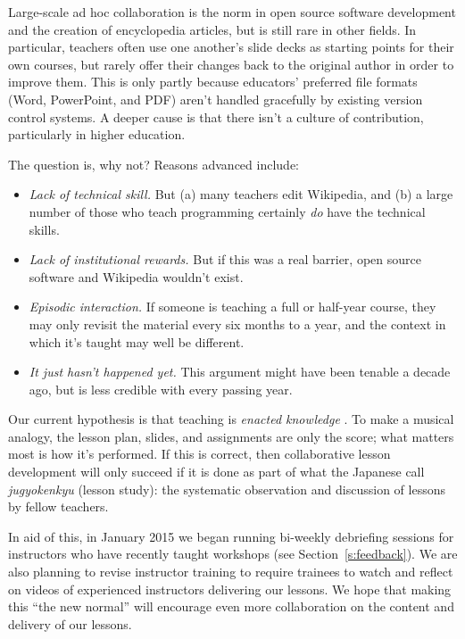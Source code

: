 \documentclass[10pt,a4paper,twocolumn]{article}
\begin{document}
Large-scale ad hoc collaboration is the norm in open source software
development and the creation of encyclopedia articles, but is still
rare in other fields. In particular, teachers often use one another's
slide decks as starting points for their own courses, but rarely offer
their changes back to the original author in order to improve
them. This is only partly because educators' preferred file formats
(Word, PowerPoint, and PDF) aren't handled gracefully by existing
version control systems.  A deeper cause is that there isn't a culture
of contribution, particularly in higher education.

The question is, why not?  Reasons advanced include:

\begin{itemize}

\item \emph{Lack of technical skill.} But (a) many teachers edit
  Wikipedia, and (b) a large number of those who teach programming
  certainly \emph{do} have the technical skills.

\item \emph{Lack of institutional rewards.} But if this was a real
  barrier, open source software and Wikipedia wouldn't exist.

\item \emph{Episodic interaction.} If someone is teaching a full or
  half-year course, they may only revisit the material every six
  months to a year, and the context in which it's taught may well be
  different.

\item \emph{It just hasn't happened yet.} This argument might have
  been tenable a decade ago, but is less credible with every passing
  year.

\end{itemize}

Our current hypothesis is that teaching is \emph{enacted knowledge}
\cite{fincher2007,fincher2012}.
To make a musical analogy, the lesson plan, slides, and assignments
are only the score; what matters most is how it's performed.  If this
is correct, then collaborative lesson development will only succeed if
it is done as part of what the Japanese call \emph{jugyokenkyu}
(lesson study): the systematic observation and discussion of lessons
by fellow teachers.

In aid of this, in January 2015 we began running bi-weekly debriefing
sessions for instructors who have recently taught workshops (see
Section~\ref{s:feedback}).  We are also planning to revise instructor
training to require trainees to watch and reflect on videos of
experienced instructors delivering our lessons.  We hope that making
this ``the new normal'' will encourage even more collaboration on the
content and delivery of our lessons.
\end{document}
